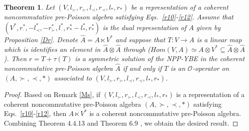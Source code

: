\documentclass[12pt]{amsart}
\newtheorem{thm}{Theorem}[section]
\theoremstyle{definition}
\begin{document}
\begin{thm} \label{Yo}
 Let $(V,l_{\succ},r_{\succ},l_{\prec},r_{\prec},l_{\ast},r_{\ast})$ be
  a representation of a coherent noncommutative pre-Poisson algebra satisfying Eqs.~\eqref{r10}-\eqref{r12}.
  Assume that $(V^*,r_{\cdot}^{*},-l_{\prec}^{*},-r_{\succ}^{*},l_{\cdot}^{*},r_{\ast}^{*}-l_{\ast}^{*},r_{\ast}^{*})$
 is the dual representation of $A$ given by Proposition \ref{Dr}. 
 Denote $\hat{A}=A\ltimes V^{*}$ and suppose
that $T:V\longrightarrow A$ is a linear map which is identifies an element in $\hat{A}\otimes \hat{A}$ through
 ($Hom(V,A)\simeq A\otimes V^{*}\subseteq \hat{A}\otimes \hat{A}$).
  Then $r=T+\tau(T)$ is a symmetric solution of
 the NPP-YBE in the coherent noncommutative pre-Poisson algebra $\hat{A}$ if and only if $T$ is an $\mathcal O$-operator
on $(A,\succ,\prec,\ast)$ associated to $(V,l_{\succ},r_{\succ},l_{\prec},r_{\prec},l_{\ast},r_{\ast})$.
\end{thm}

\begin{proof}
Based on Remark \ref{Ms}, if $(V,l_{\succ},r_{\succ},l_{\prec},r_{\prec},l_{\ast},r_{\ast})$ is a representation of
 a coherent noncommutative pre-Poisson algebra $(A,\succ,\prec,\ast)$ satisfying Eqs.~\eqref{r10}-\eqref{r12},
 then $A\ltimes V^{*}$ is a coherent noncommutative pre-Poisson algebra. Combining 
 Theorem 4.4.13 \cite{B2} and Theorem 6.9 \cite{B1}, we obtain the desired result.
\end{proof}
\end{document}
